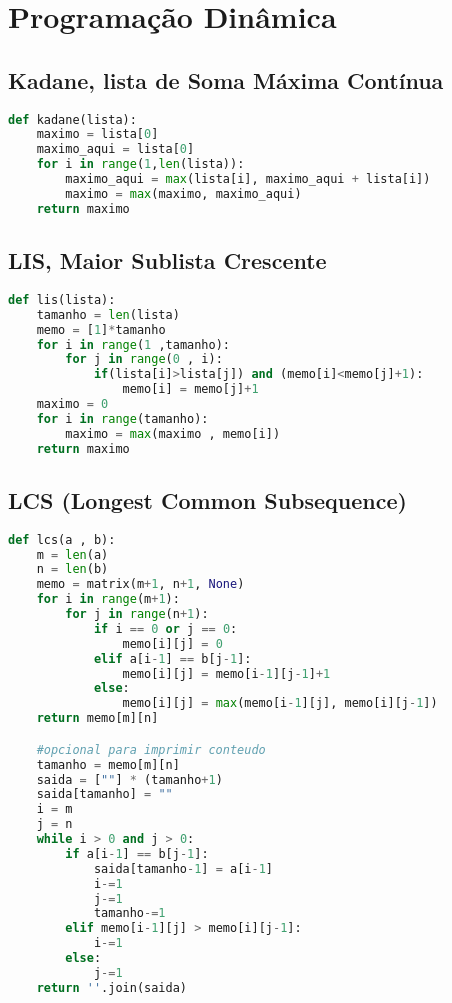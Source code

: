 \chapter{Programação Dinâmica}
\section*{Kadane, lista de Soma Máxima Contínua}
\begin{lstlisting}[language = Python]
def kadane(lista):
	maximo = lista[0]
	maximo_aqui = lista[0] 
	for i in range(1,len(lista)):
		maximo_aqui = max(lista[i], maximo_aqui + lista[i])
		maximo = max(maximo, maximo_aqui)   
	return maximo
\end{lstlisting}
\newpage

\section{LIS, Maior Sublista Crescente}
\begin{lstlisting}[language=Python]
def lis(lista):
	tamanho = len(lista)
	memo = [1]*tamanho
	for i in range(1 ,tamanho):
		for j in range(0 , i):
			if(lista[i]>lista[j]) and (memo[i]<memo[j]+1):
				memo[i] = memo[j]+1
	maximo = 0
	for i in range(tamanho):
		maximo = max(maximo , memo[i])
	return maximo

\end{lstlisting}

\section{LCS (Longest Common Subsequence)}
\begin{lstlisting}[language = Python]
def lcs(a , b):
    m = len(a)
    n = len(b)
    memo = matrix(m+1, n+1, None)
    for i in range(m+1):
        for j in range(n+1):
            if i == 0 or j == 0:
                memo[i][j] = 0
            elif a[i-1] == b[j-1]:
                memo[i][j] = memo[i-1][j-1]+1
            else:
                memo[i][j] = max(memo[i-1][j], memo[i][j-1])
    return memo[m][n]

    #opcional para imprimir conteudo
    tamanho = memo[m][n]
    saida = [""] * (tamanho+1)
    saida[tamanho] = ""
    i = m
    j = n
    while i > 0 and j > 0:
        if a[i-1] == b[j-1]:
            saida[tamanho-1] = a[i-1]
            i-=1
            j-=1
            tamanho-=1
        elif memo[i-1][j] > memo[i][j-1]:
            i-=1
        else:
            j-=1
    return ''.join(saida)
\end{lstlisting}

